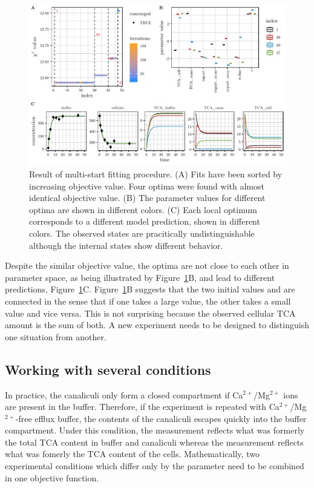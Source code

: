 \documentclass[article]{jss}
\begin{document}
\begin{figure}[t!]
\centering
\includegraphics[width = \textwidth]{Figures/figure5}
\caption{Result of multi-start fitting procedure. (A) Fits have been sorted by increasing objective value. Four optima were found with almost identical objective value. (B) The parameter values for different optima are shown in different colors. (C) Each local optimum corresponds to a different model prediction, shown in different colors. The observed states are pracitically undistinguishable although the internal states show different behavior.}
\label{fig:mstrust}
\end{figure}
Despite the similar objective value, the optima are not close to each other in parameter space, as being illustrated by Figure~\ref{fig:mstrust}B, and lead to different predictions, Figure~\ref{fig:mstrust}C. 
Figure~\ref{fig:mstrust}B suggests that the two initial values  and  are connected in the sense that if one takes a large value, the other takes a small value and vice versa.
This is not surprising because the observed cellular TCA amount is the sum of both. A new experiment needs to be designed to distinguish one situation from another.


\subsection{Working with several conditions}\label{sec:conditions}
In practice, the canaliculi only form a closed compartment if Ca$^{2+}$/Mg$^{2+}$ ions are present in the buffer. Therefore, if the experiment is repeated with Ca$^{2+}$/Mg$^{2+}$-free efflux buffer, the contents of the canaliculi escapes quickly into the buffer compartment. Under this condition, the  measurement reflects what was formerly the total TCA content in buffer and canaliculi whereas the  measurement reflects what was fomerly the TCA content of the cells.
Mathematically, two experimental conditions which differ only by the  parameter need to be combined in one objective function.
\end{document}
